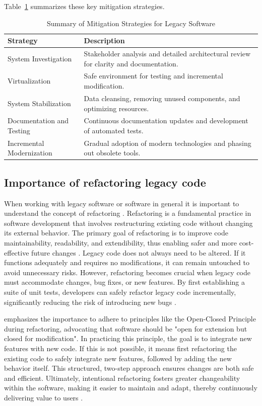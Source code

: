 Table~\ref{tab:mitigation_strategies} summarizes these key mitigation strategies.

\begin{table}[htbp]
\centering
\begin{tabular}{|l|p{8cm}|}
\hline
\textbf{Strategy} & \textbf{Description} \\
\hline
System Investigation & Stakeholder analysis and detailed architectural review for clarity and documentation. \\ \hline
Virtualization & Safe environment for testing and incremental modification. \\ \hline
System Stabilization & Data cleansing, removing unused components, and optimizing resources. \\ \hline
Documentation and Testing & Continuous documentation updates and development of automated tests. \\ \hline
Incremental Modernization & Gradual adoption of modern technologies and phasing out obsolete tools. \\ \hline
\end{tabular}
\caption{Summary of Mitigation Strategies for Legacy Software \citep{annettWorkingLegacySystems2019}}
\label{tab:mitigation_strategies}
\end{table}

\subsection{Importance of refactoring legacy code}
When working with legacy software or software in general it is important to understand the concept of refactoring \citep{feathersWorkingEffectivelyLegacy2004}.
Refactoring is a fundamental practice in software development that involves restructuring existing code without changing its external behavior.
The primary goal of refactoring is to improve code maintainability, readability, and extendibility, thus enabling safer and more \mbox{cost-effective} future changes \citep{feathersWorkingEffectivelyLegacy2004}.
Legacy code does not always need to be altered.
If it functions adequately and requires no modifications, it can remain untouched to avoid unnecessary risks.
However, refactoring becomes crucial when legacy code must accommodate changes, bug fixes, or new features.
By first establishing a suite of unit tests, developers can safely refactor legacy code incrementally, significantly reducing the risk of introducing new bugs \citep{bernsteinLegacyCodeNine2015}.

\citet{bernsteinLegacyCodeNine2015} emphasizes the importance to adhere to principles like the \mbox{Open-Closed} Principle during refactoring, advocating that software should be "open for extension but closed for modification".
In practicing this principle, the goal is to integrate new features with new code.
If this is not possible, it means first refactoring the existing code to safely integrate new features, followed by adding the new behavior itself.
This structured, two-step approach ensures changes are both safe and efficient.
Ultimately, intentional refactoring fosters greater changeability within the software, making it easier to maintain and adapt, thereby continuously delivering value to users \citep{bernsteinLegacyCodeNine2015}.

